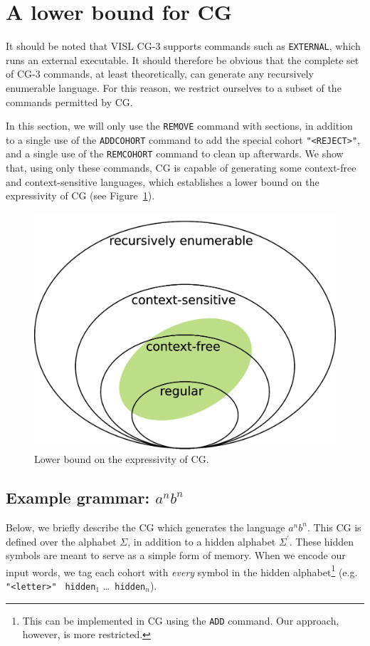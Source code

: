 \documentclass[11pt]{article}
\def\t#1{\texttt{#1}}
\def\hidden#1{{\tt \color{gray} #1}}
\begin{document}
\section{A lower bound for CG}

It should be noted that VISL CG-3 \cite{bick2015,vislcg3} supports commands 
such as \t{EXTERNAL}, which runs an external executable. It should therefore 
be obvious that the complete set of CG-3 commands, at least theoretically, 
can generate any recursively enumerable language. For this reason, we restrict 
ourselves to a subset of the commands permitted by CG.

In this section, we will only use the \t{REMOVE} command with sections, in
addition to a single use of the \t{ADDCOHORT} command to add the special cohort
\t{"<REJECT>"}, and a single use of the \t{REMCOHORT} command to clean up
afterwards. 
We show that, using only these commands, CG is capable of generating some
context-free and context-sensitive languages, which establishes a lower bound on 
the expressivity of CG (see Figure~\ref{fig:nocorr}).

\begin{figure}[h]
  \centering
  \includegraphics[width=0.8\linewidth]{chomsky}
  \caption{Lower bound on the expressivity of CG.}
  \label{fig:nocorr}
\end{figure}

\subsection{Example grammar: $a^nb^n$ }

Below, we briefly describe the CG which generates the language $a^nb^n$.
This CG is defined over the alphabet $\Sigma$, in addition to a hidden alphabet
$\Sigma^\prime$. These hidden symbols are meant to serve as a simple form of
memory. When we encode our input words, we tag each cohort with \emph{every}
symbol in the hidden alphabet\footnote{
  This can be implemented in CG using the \t{ADD} command.
  Our approach, however, is more restricted. 
} (e.g. \t{"<letter>"} \hidden{hidden$_1$} \dots \hidden{hidden$_n$}).
\end{document}
